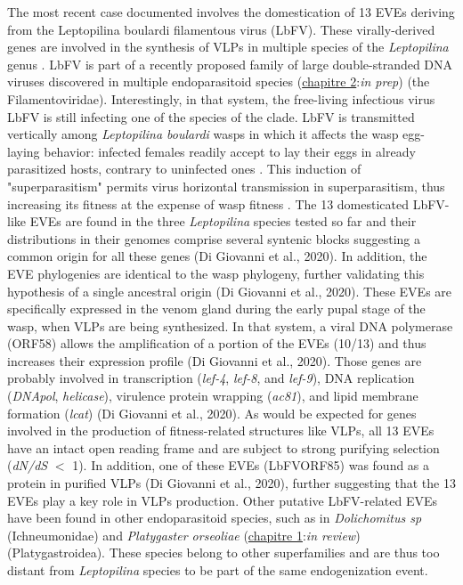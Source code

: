 The most recent case documented involves the domestication of 13 EVEs deriving from the Leptopilina boulardi filamentous virus (LbFV). These virally-derived genes are involved in the synthesis of VLPs in multiple species of the \textit{Leptopilina} genus \cite{di_giovanni_behavior-manipulating_2020}.
LbFV is part of a recently proposed family of large double-stranded DNA viruses discovered in multiple endoparasitoid species (\hyperref[sec:chap2]{chapitre 2}:\textit{in prep}) (the Filamentoviridae). Interestingly, in that system, the free-living infectious virus LbFV is still infecting one of the species of the clade. LbFV is transmitted vertically among \textit{Leptopilina boulardi} wasps in which it affects the wasp egg-laying behavior: infected females readily accept to lay their eggs in already parasitized hosts, contrary to uninfected ones \citep{varaldi_artifical_2006,varaldi_infectious_2003}. This induction of "superparasitism" permits virus horizontal transmission in superparasitism, thus increasing its fitness at the expense of wasp fitness \citep{gandon_superparasitism_2006}. The 13 domesticated LbFV-like EVEs are found in the three \textit{Leptopilina} species tested so far and their distributions in their genomes comprise several syntenic blocks suggesting a common origin for all these genes (Di Giovanni et al., 2020). In addition, the EVE phylogenies are identical to the wasp phylogeny, further validating this hypothesis of a single ancestral origin (Di Giovanni et al., 2020). These EVEs are specifically expressed in the venom gland during the early pupal stage of the wasp, when VLPs are being synthesized. In that system, a viral DNA polymerase (ORF58) allows the amplification of a portion of the EVEs (10/13) and thus increases their expression profile (Di Giovanni et al., 2020). Those genes are probably involved in transcription (\textit{lef-4}, \textit{lef-8}, and \textit{lef-9}), DNA replication (\textit{DNApol}, \textit{helicase}), virulence protein wrapping (\textit{ac81}), and lipid membrane formation (\textit{lcat}) (Di Giovanni et al., 2020). As would be expected for genes involved in the production of fitness-related structures like VLPs, all 13 EVEs have an intact open reading frame and are subject to strong purifying selection (\textit{\textit{dN/dS}} $<$ 1). In addition, one of these EVEs (LbFVORF85) was found as a protein in purified VLPs (Di Giovanni et al., 2020), further suggesting that the 13 EVEs play a key role in VLPs production. Other putative LbFV-related EVEs have been found in other endoparasitoid species, such as in \textit{Dolichomitus sp} (Ichneumonidae) \citep{burke_presence_2021} and \textit{Platygaster orseoliae} (\hyperref[sec:chap1]{chapitre 1}:\textit{in review}) (Platygastroidea). These species belong to other superfamilies and are thus too distant from \textit{Leptopilina} species to be part of the same endogenization event.\newline 

